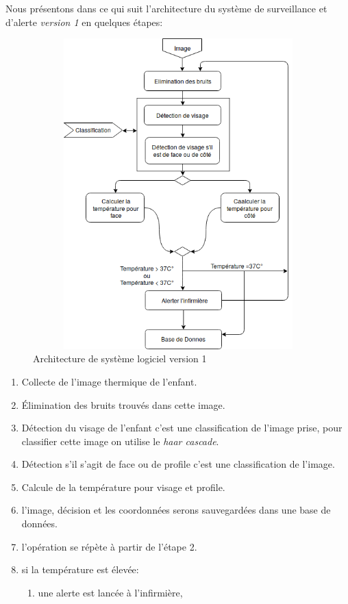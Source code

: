 \documentclass[12pt]{article}
\begin{document}
Nous présentons dans ce qui suit l'architecture du système de surveillance et d'alerte \textit{version 1}  en quelques étapes:
\newpage
\begin{figure}[h]
	\centering
	\includegraphics[height=12cm,width=12cm]{img-Chapiter-3/Picture1.png}
	\caption{Architecture de système logiciel version 1}
	\label{fig:achdelasolu}
\end{figure}
\begin{enumerate}
	\item Collecte de l’image thermique de l’enfant.
	\item \' Elimination des bruits trouvés dans cette image.
	\item Détection du visage de l’enfant c'est une classification de l’image prise, pour classifier cette image on utilise le \textit{haar cascade}.
	\item Détection s’il s’agit  de face ou de profile c'est une classification de l’image.
	\item Calcule de la température pour visage et profile. 
	\item l'image, décision et les coordonnées serons sauvegardées dans une base de données. 
	\item l’opération se répète à partir de  l’étape 2.
	\item si la température est élevée:
	\begin{enumerate}
		\item une alerte est lancée à l’infirmière,
	\end{enumerate}
\end{enumerate}
\end{document}

